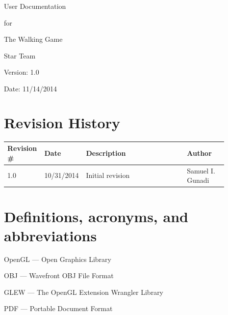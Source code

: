 \documentclass[12pt,letterpaper]{article}
\begin{document}
	\vspace*{2.8 in}
	\begin{huge}
		\begin{center}
			User Documentation
			\par
			for
			\par
			The Walking Game
			\par
		\end{center}
	\end{huge}
	\vspace*{2.5 in}
	\begin{large}
		\begin{flushright}
			Star Team
			
			Version: 1.0
			
			Date: 11/14/2014
		\end{flushright}
	\end{large}
	
	\clearpage
	\section*{Revision History}
	\begin{flushleft}
		\begin{tabular}{|p{0.14\linewidth}|p{0.12\linewidth}|p{0.45\linewidth}|p{0.18\linewidth}|}
			\hline
			\textbf{Revision \#} & \textbf{Date} & \textbf{Description} & \textbf{Author} \\\hline
			1.0 & 10/31/2014 & Initial revision & Samuel I. Gunadi \\\hline
		\end{tabular}
	\end{flushleft}
	\clearpage
	
	\clearpage
	\tableofcontents
	
	\clearpage
	\setcounter{page}{0}
	
	
	\section{Definitions, acronyms, and abbreviations}
	OpenGL --- Open Graphics Library
	
	\vspace{0.1in}\noindent OBJ --- Wavefront OBJ File Format
	
	\vspace{0.1in}\noindent GLEW --- The OpenGL Extension Wrangler Library 
	
	\vspace{0.1in}\noindent PDF --- Portable Document Format
	
\end{document}
